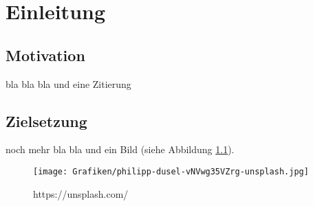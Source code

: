 \newpage
\chapter{Einleitung}
    \section{Motivation}
        bla bla bla und eine Zitierung\cite{Chauhan.2014}
    \section{Zielsetzung}
        noch mehr bla bla und ein Bild (siehe Abbildung \ref{fig:dasBild}).
        \begin{figure}[H]
            \centering
            \texttt{[image: Grafiken/philipp-dusel-vNVwg35VZrg-unsplash.jpg]}
            \caption{https://unsplash.com/}
            \label{fig:dasBild}
        \end{figure}